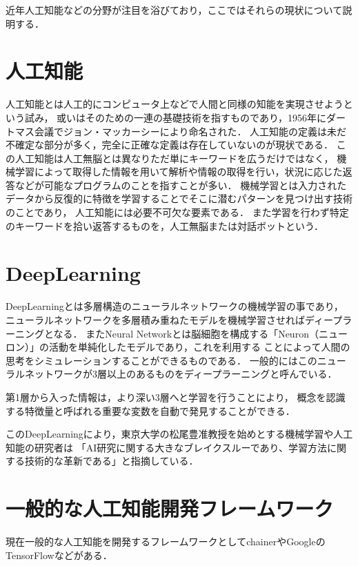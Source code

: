 近年人工知能などの分野が注目を浴びており，ここではそれらの現状について説明する．

\section{人工知能}
人工知能\cite{tino}とは人工的にコンピュータ上などで人間と同様の知能を実現させようという試み，
或いはそのための一連の基礎技術を指すものであり，1956年にダートマス会議でジョン・マッカーシーにより命名された．
人工知能の定義は未だ不確定な部分が多く，完全に正確な定義は存在していないのが現状である．
この人工知能は人工無脳とは異なりただ単にキーワードを広うだけではなく，
機械学習によって取得した情報を用いて解析や情報の取得を行い，状況に応じた返答などが可能なプログラムのことを指すことが多い．
機械学習とは入力されたデータから反復的に特徴を学習することでそこに潜むパターンを見つけ出す技術のことであり，
人工知能には必要不可欠な要素である．
また学習を行わず特定のキーワードを拾い返答するものを，人工無脳または対話ボットという．\cite{muno}

\section{DeepLearning}
DeepLearning\cite{deep}とは多層構造のニューラルネットワークの機械学習の事であり，
ニューラルネットワークを多層積み重ねたモデルを機械学習させればディープラーニングとなる．
またNeural Networkとは脳細胞を構成する「Neuron（ニューロン）」の活動を単純化したモデルであり，これを利用する
ことによって人間の思考をシミュレーションすることができるものである．
一般的にはこのニューラルネットワークが3層以上のあるものをディープラーニングと呼んでいる．

第1層から入った情報は，より深い3層へと学習を行うことにより，
概念を認識する特徴量と呼ばれる重要な変数を自動で発見することができる．

このDeepLearningにより，東京大学の松尾豊准教授\cite{boom}を始めとする機械学習や人工知能の研究者は
「AI研究に関する大きなブレイクスルーであり、学習方法に関する技術的な革新である」と指摘している．

\section{一般的な人工知能開発フレームワーク}\label{sec:ippan}
現在一般的な人工知能を開発するフレームワークとしてchainerやGoogleのTensorFlowなどがある．

